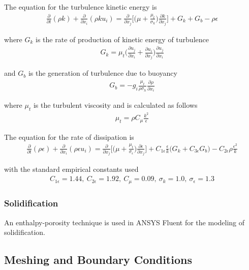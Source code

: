 \documentclass[onehalf,11pt]{beavtex}
\begin{document}
The equation for the turbulence kinetic energy is 
\begin{align}
	\frac{\partial}{\partial t} (\rho k) + \frac{\partial}{\partial x_i} (\rho k u_i) = \frac{\partial}{\partial x_j} \Big[ \Big( \mu + \frac{\mu_t}{\sigma_k}\Big) \frac{\partial k}{\partial x_j} \Big] + G_k + G_b - \rho \epsilon 
\end{align}

where $G_k$ is the rate of production of kinetic energy of turbulence
\begin{align}
	G_k = \mu_t \Big( \frac{\partial u_j}{\partial x_i} + \frac{\partial u_i}{\partial x_j} \Big) \frac{\partial u_j}{\partial x_i}
\end{align}

and $G_b$ is the generation of turbulence due to buoyancy
\begin{align}
	G_b = -g_i \frac{\mu_t}{\rho \sigma_h} \frac{\partial \rho}{\partial x_i}
\end{align}

where $\mu_t$ is the turbulent viscosity and is calculated as follows
\begin{align}
	\mu_t = \rho C_{\mu} \frac{k^2}{\epsilon}
\end{align}	

The equation for the rate of dissipation is
\begin{align}
	\frac{\partial}{\partial t} (\rho \epsilon) + \frac{\partial}{\partial x_i} (\rho \epsilon u_i) = \frac{\partial}{\partial x_j} \Big[ \Big( \mu + \frac{\mu_t}{\sigma_{\epsilon}}\Big) \frac{\partial \epsilon}{\partial x_j} \Big] + C_{1\epsilon}\frac{\epsilon}{k}\Big(G_k + C_{3\epsilon}G_b\Big) - C_{2\epsilon}\rho\frac{\epsilon^2}{k} 
\end{align}

with the standard empirical constants used
\begin{align}
	C_{1\epsilon} = 1.44, \ C_{2\epsilon} = 1.92,\ C_{\mu} = 0.09,\ \sigma_{k} = 1.0,\ \sigma_{\epsilon} = 1.3
\end{align} 

\subsubsection{Solidification}

An enthalpy-porosity technique is used in ANSYS Fluent for the modeling of solidification. 


\subsection{Meshing and Boundary Conditions}
\end{document}
